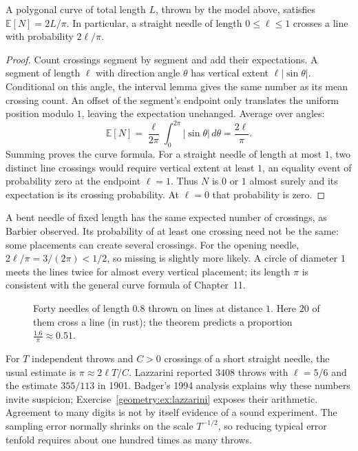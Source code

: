 \begin{theorem}\label{geometry:thm:buffon}
A polygonal curve of total length $L$, thrown by the model above, satisfies $\mathbb E[N]=2L/\pi$. In particular, a straight needle of length $0\le\ell\le1$ crosses a line with probability $2\ell/\pi$.
\end{theorem}

\begin{proof}
Count crossings segment by segment and add their expectations. A segment of length $\ell$ with direction angle $\theta$ has vertical extent $\ell|\sin\theta|$. Conditional on this angle, the interval lemma gives the same number as its mean crossing count. An offset of the segment's endpoint only translates the uniform position modulo $1$, leaving the expectation unchanged. Average over angles:
\[
\mathbb E[N]=\frac{\ell}{2\pi}\int_0^{2\pi}|\sin\theta|\,d\theta
=\frac{2\ell}{\pi}.
\]
Summing proves the curve formula. For a straight needle of length at most $1$, two distinct line crossings would require vertical extent at least $1$, an equality event of probability zero at the endpoint $\ell=1$. Thus $N$ is $0$ or $1$ almost surely and its expectation is its crossing probability. At $\ell=0$ that probability is zero.
\end{proof}

A bent needle of fixed length has the same expected number of crossings, as Barbier observed. Its probability of at least one crossing need not be the same: some placements can create several crossings. For the opening needle, $2\ell/\pi=3/(2\pi)<1/2$, so missing is slightly more likely. A circle of diameter $1$ meets the lines twice for almost every vertical placement; its length $\pi$ is consistent with the general curve formula of Chapter~11.

\begin{figure}[ht]
\centering
{}
\caption{Forty needles of length $0.8$ thrown on lines at distance $1$. Here $20$ of them cross a line (in rust); the theorem predicts a proportion
$\frac{1.6}\pi\approx0.51$.}
\label{geometry:fig:buffon}
\end{figure}

For $T$ independent throws and $C>0$ crossings of a short straight needle, the usual estimate is $\pi\approx2\ell T/C$. Lazzarini reported $3408$ throws with $\ell=5/6$ and the estimate $355/113$ in 1901. Badger's 1994 analysis explains why these numbers invite suspicion; Exercise~\ref{geometry:ex:lazzarini} exposes their arithmetic. Agreement to many digits is not by itself evidence of a sound experiment. The sampling error normally shrinks on the scale $T^{-1/2}$, so reducing typical error tenfold requires about one hundred times as many throws.

